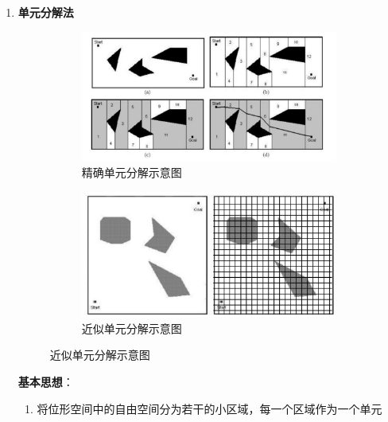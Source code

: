 \documentclass[../main.tex]{subfiles}
\begin{document}
\begin{enumerate}
\begin{enumerate}
\begin{itemize}
\begin{itemize}
                        \end{itemize}
                \end{itemize}
        \end{enumerate}
    \item \textbf{单元分解法}\label{item:res:cell}
        \begin{figure}[H]
            \centering
            \begin{subfigure}[b]{0.48\textwidth}
                \centering
                \includegraphics[width=\linewidth]{images/jingquedanyuanfenjie.png}
                \caption{精确单元分解示意图}
                \label{fig:exact-cell}
            \end{subfigure}
            \hfill
            \begin{subfigure}[b]{0.48\textwidth}
                \centering
                \includegraphics[width=\linewidth]{images/shangebiaoshifa.png}
                \caption{近似单元分解示意图}
                \label{fig:approx-cell}
            \end{subfigure}
        \end{figure}
    \textbf{基本思想}：
        \begin{enumerate}
            \item 将位形空间中的自由空间分为若干的小区域，每一个区域作为一个单元

\end{enumerate}
\end{enumerate}
\end{document}
